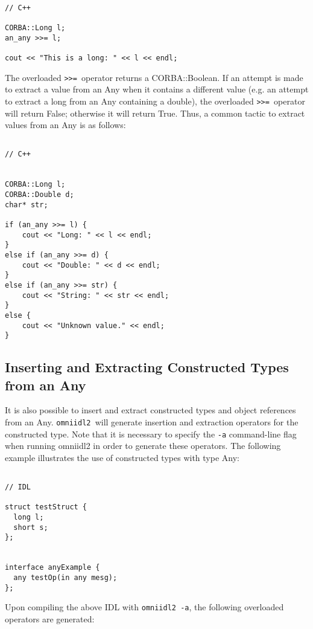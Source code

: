 \documentclass[11pt,twoside,onecolumn]{book}
\begin{document}
{\small
\begin{verbatim}

// C++

CORBA::Long l;
an_any >>= l;

cout << "This is a long: " << l << endl;

\end{verbatim}
}


The overloaded {\tt >>= }operator returns a CORBA::Boolean. If an attempt is 
made to extract a value from an Any when it contains a different value (e.g. 
an attempt to extract a long from an Any containing a double), the overloaded 
{\tt >>= }operator will return False; otherwise it will return True. Thus, a 
common tactic to extract values from an Any is as follows:
\pagebreak

{\small
\begin{verbatim}

// C++


CORBA::Long l;
CORBA::Double d;
char* str;

if (an_any >>= l) {
    cout << "Long: " << l << endl;
}
else if (an_any >>= d) {
    cout << "Double: " << d << endl;
}
else if (an_any >>= str) {
    cout << "String: " << str << endl;
}
else {
    cout << "Unknown value." << endl;
}

\end{verbatim}
}


\subsection{Inserting and Extracting Constructed Types from an Any}

It is also possible to insert and extract constructed types and object
references from an Any. {\tt omniidl2 }will generate insertion and extraction 
operators for the constructed type. Note that it is necessary to specify
the {\tt -a} command-line flag when running omniidl2 in order to generate
these operators. The following example illustrates the use of constructed types
with type Any:

{\small
\begin{verbatim}

// IDL

struct testStruct {
  long l;
  short s;
};


interface anyExample {
  any testOp(in any mesg);
};

\end{verbatim}
}

Upon compiling the above IDL with {\tt omniidl2 -a}, the following overloaded 
operators are generated: 
\end{document}

